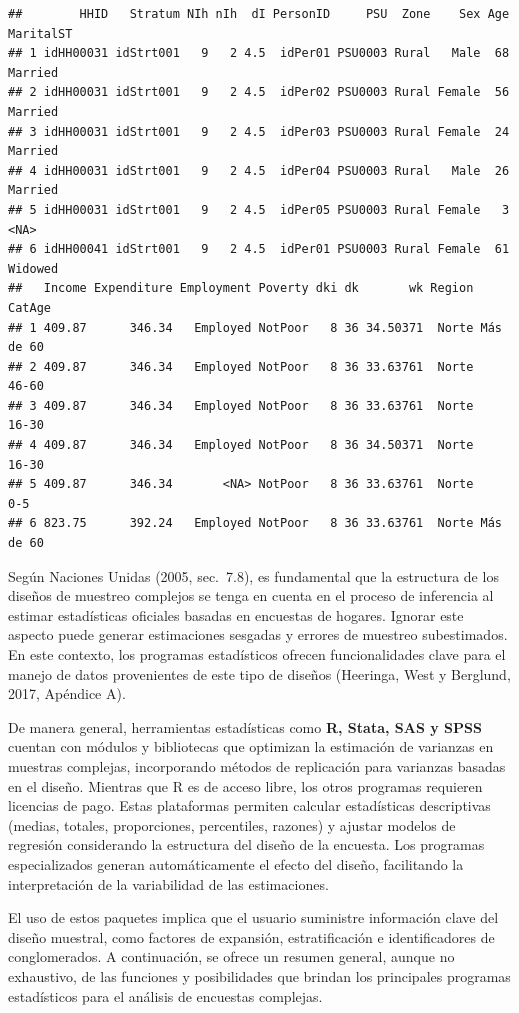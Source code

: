 \documentclass[
  12pt,
]{book}
\begin{document}
\begin{verbatim}
##        HHID   Stratum NIh nIh  dI PersonID     PSU  Zone    Sex Age MaritalST
## 1 idHH00031 idStrt001   9   2 4.5  idPer01 PSU0003 Rural   Male  68   Married
## 2 idHH00031 idStrt001   9   2 4.5  idPer02 PSU0003 Rural Female  56   Married
## 3 idHH00031 idStrt001   9   2 4.5  idPer03 PSU0003 Rural Female  24   Married
## 4 idHH00031 idStrt001   9   2 4.5  idPer04 PSU0003 Rural   Male  26   Married
## 5 idHH00031 idStrt001   9   2 4.5  idPer05 PSU0003 Rural Female   3      <NA>
## 6 idHH00041 idStrt001   9   2 4.5  idPer01 PSU0003 Rural Female  61   Widowed
##   Income Expenditure Employment Poverty dki dk       wk Region    CatAge
## 1 409.87      346.34   Employed NotPoor   8 36 34.50371  Norte Más de 60
## 2 409.87      346.34   Employed NotPoor   8 36 33.63761  Norte     46-60
## 3 409.87      346.34   Employed NotPoor   8 36 33.63761  Norte     16-30
## 4 409.87      346.34   Employed NotPoor   8 36 34.50371  Norte     16-30
## 5 409.87      346.34       <NA> NotPoor   8 36 33.63761  Norte       0-5
## 6 823.75      392.24   Employed NotPoor   8 36 33.63761  Norte Más de 60
\end{verbatim}

Según Naciones Unidas (2005, sec.~7.8), es fundamental que la estructura de los diseños de muestreo complejos se tenga en cuenta en el proceso de inferencia al estimar estadísticas oficiales basadas en encuestas de hogares. Ignorar este aspecto puede generar estimaciones sesgadas y errores de muestreo subestimados. En este contexto, los programas estadísticos ofrecen funcionalidades clave para el manejo de datos provenientes de este tipo de diseños (Heeringa, West y Berglund, 2017, Apéndice A).

De manera general, herramientas estadísticas como \textbf{R, Stata, SAS y SPSS} cuentan con módulos y bibliotecas que optimizan la estimación de varianzas en muestras complejas, incorporando métodos de replicación para varianzas basadas en el diseño. Mientras que R es de acceso libre, los otros programas requieren licencias de pago. Estas plataformas permiten calcular estadísticas descriptivas (medias, totales, proporciones, percentiles, razones) y ajustar modelos de regresión considerando la estructura del diseño de la encuesta. Los programas especializados generan automáticamente el efecto del diseño, facilitando la interpretación de la variabilidad de las estimaciones.

El uso de estos paquetes implica que el usuario suministre información clave del diseño muestral, como factores de expansión, estratificación e identificadores de conglomerados. A continuación, se ofrece un resumen general, aunque no exhaustivo, de las funciones y posibilidades que brindan los principales programas estadísticos para el análisis de encuestas complejas.
\end{document}
